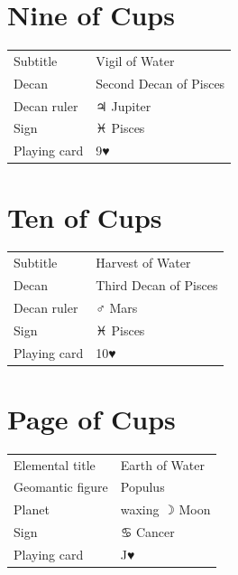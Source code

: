 \newpage
\section*{Nine of Cups}

\begin{center}
\end{center}

\vspace{4mm}
\noindent\begin{tabular}{@{}l@{\quad}l@{}}
Subtitle & Vigil of Water \\
Decan & Second Decan of Pisces \\
Decan ruler & {\symbfont ♃} Jupiter \\
Sign & {\symbfont ♓} Pisces \\
Playing card & 9♥ \\
\end{tabular}

\newpage
\section*{Ten of Cups}

\begin{center}
\end{center}

\vspace{4mm}
\noindent\begin{tabular}{@{}l@{\quad}l@{}}
Subtitle & Harvest of Water \\
Decan & Third Decan of Pisces \\
Decan ruler & {\symbfont ♂} Mars \\
Sign & {\symbfont ♓} Pisces \\
Playing card & 10♥ \\
\end{tabular}

\newpage
\section*{Page of Cups}

\begin{center}
\end{center}

\vspace{4mm}
\noindent\begin{tabular}{@{}l@{\quad}l@{}}
Elemental title & Earth of Water \\
Geomantic figure & Populus \\
Planet & waxing {\symbfont ☽} Moon \\
Sign & {\symbfont ♋} Cancer \\
Playing card & J♥ \\
\end{tabular}

